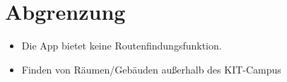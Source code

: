 \section{Abgrenzung}

\begin{itemize}

    \item Die App bietet keine Routenfindungsfunktion. 
    \item Finden von Räumen/Gebäuden außerhalb des KIT-Campus

\end{itemize}